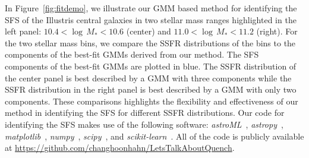 \documentclass[tighten, preprint]{aastex62}
\begin{document}


In Figure~\ref{fig:fitdemo}, we illustrate our GMM based method for identifying the SFS of the Illustris central galaxies 
in two stellar mass ranges highlighted in the left panel: $10.4 < \log\,M_* < 10.6$ (center) 
and $11.0 < \log\,M_* < 11.2$ (right). For the two stellar mass bins, 
we compare the SSFR distributions of the bins to the components of the 
best-fit GMMs derived from our method. The SFS components of the best-fit 
GMMs are plotted in blue. The SSFR distribution of the center panel is best 
described by a GMM with three components while the SSFR distribution 
in the right  panel is best described by a GMM with only two components.
These comparisons highlights the flexibility and effectiveness of our 
method in identifying the SFS for different SSFR  distributions. 
Our code for identifying the SFS makes use of the following software: 
{\em astroML}~\citep{astroML}, {\em astropy}~\citep{astropy:2013,theastropycollaboration2018}, 
{\em matplotlib}~\citep{Hunter:2007}, {\em numpy}~\citep{numpy:2011}, 
{\em scipy}~\citep{scipy:2001}, and {\em scikit-learn}~\citep{scikit-learn:2011}. 
All of the code is publicly available at \url{https://github.com/changhoonhahn/LetsTalkAboutQuench}.
\end{document}
